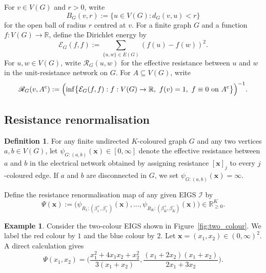 \documentclass{article}
\theoremstyle{plain}
\theoremstyle{definition}
\newtheorem{definition}[theorem]{Definition}
\newtheorem{example}[theorem]{Example}
\newcommand{\Reff}{\mathscr{R}}
\begin{document}
For $v\in V(G)$ and $r>0$, write
\[
B_G(v,r):=\{u\in V(G): d_G(v,u)<r\}
\]
for the open ball of radius $r$ centred at $v$.
For a finite graph $G$ and a function $f:V(G)\to\mathbb R$, define the Dirichlet energy by
\[
\mathcal E_G(f,f):=\sum_{\{u,w\}\in E(G)} (f(u)-f(w))^2.
\]
For $u,w\in V(G)$, write $\Reff_G(u,w)$ for the effective resistance between $u$ and $w$ in the unit-resistance network on $G$.
For $A\subseteq V(G)$, write
\[
\Reff_G(v,A^{\mathrm c})
:=
\Bigl(
\inf\bigl\{
\mathcal E_G(f,f): f:V(G)\to\mathbb R,\ f(v)=1,\ f\equiv 0 \text{ on } A^{\mathrm c}
\bigr\}
\Bigr)^{-1}.
\]

\subsection{Resistance renormalisation}\label{subsec:resistance}

\begin{definition}\label{def:psi_Psi}
For any finite undirected $K$-coloured graph $G$ and any two vertices $a,b\in V(G)$,
let $\psi_{G:(a,b)}(\mathbf x)\in[0,\infty]$ denote the effective resistance between $a$ and $b$
in the electrical network obtained by assigning resistance $[\mathbf x]_j$ to every $j$-coloured edge.
If $a$ and $b$ are disconnected in $G$, we set $\psi_{G:(a,b)}(\mathbf x)=\infty$.

Define the resistance renormalisation map of any given EIGS $\mathscr I$ by
\[
\Psi(\mathbf x):=\big(\psi_{R_1:(\beta_1^+,\beta_1^-)}(\mathbf x),\dots,
\psi_{R_K:(\beta_K^+,\beta_K^-)}(\mathbf x)\big)\in\mathbb R_{\ge 0}^K.
\]
\end{definition}

\begin{example}\label{ex:Psi_two_colours}
Consider the two-colour EIGS shown in Figure~\ref{fig:two_colour}.
We label the red colour by $1$ and the blue colour by $2$.
Let $\mathbf x=(x_1,x_2)\in(0,\infty)^2$.
A direct calculation gives
\[
\Psi(x_1,x_2)
=
\Big(
\frac{x_1^2+4x_1x_2+x_2^2}{3(x_1+x_2)},
\frac{(x_1+2x_2)(x_1+x_2)}{2x_1+3x_2}
\Big).
\]
\end{example}
\end{document}
